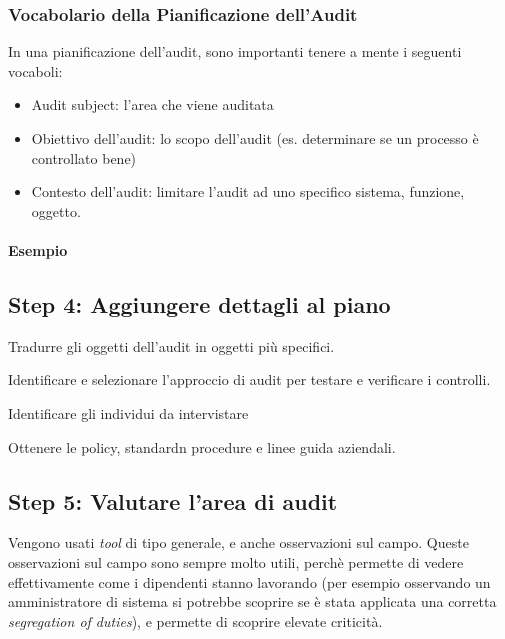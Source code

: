 \subsubsection{Vocabolario della Pianificazione dell'Audit}

In una pianificazione dell'audit, sono importanti tenere a mente i seguenti 
vocaboli:
\begin{itemize}
\item Audit subject: l'area che viene auditata
\item Obiettivo dell'audit: lo scopo dell'audit (es. determinare se un processo 
è controllato bene)
\item Contesto dell'audit: limitare l'audit ad uno specifico sistema, funzione, 
oggetto.
\end{itemize}

\paragraph*{Esempio}








\subsection{Step 4: Aggiungere dettagli al piano}


Tradurre gli oggetti dell'audit in oggetti più specifici.

Identificare e selezionare l'approccio di audit per testare e verificare i 
controlli.

Identificare gli individui da intervistare

Ottenere le policy, standardn procedure e linee guida aziendali.


\subsection{Step 5: Valutare l'area di audit}

Vengono usati \textit{tool} di tipo generale, e anche osservazioni sul campo. 
Queste osservazioni sul campo sono sempre molto utili, perchè permette di vedere 
effettivamente come i dipendenti stanno lavorando (per esempio osservando un 
amministratore di sistema si potrebbe scoprire se è stata applicata una corretta 
\textit{segregation of duties}), e permette di scoprire elevate criticità.


